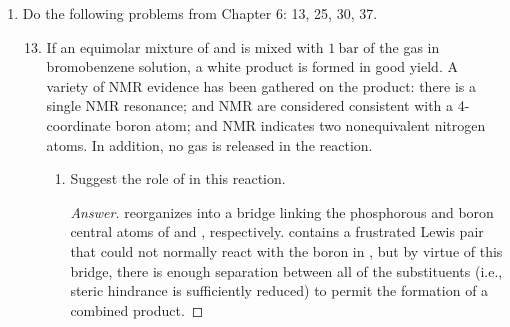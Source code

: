 \documentclass[../psets.tex]{subfiles}
\begin{document}
\begin{enumerate}[label={\Roman*)}]
\begin{enumerate}[label={\alph*.}]
\begin{proof}[Answer]
            \begin{align*}
                \frac{2k_FNa}{\pi} &= \frac{N}{4}\\
                \frac{k_Fa}{\pi} &= \frac{1}{8}\\
                k_F &= \frac{\pi}{8a}\\
                \Aboxed{k_F &= \SI{6.25e8}{\meter}}
            \end{align*}
            As to the other part of the question, refer to Figure \ref{fig:s-orbitalsb} once again. It tells us that the height of the Fermi energy above the bottom of the band is given by
            \begin{align*}
                h &= E(k_F)-E(0)\\
                &= \alpha+2\beta\cos\left( \frac{\pi}{8a}\cdot a \right)-(\alpha+2\beta\cos(0\cdot a))\\
                &= 2\beta\left( \cos\left( \frac{\pi}{8} \right)-1 \right)\\
                \Aboxed{h &= \SI{0.304}{eV}}
            \end{align*}
        \end{proof}
    \end{enumerate}
    \newpage
    \item Do the following problems from Chapter 6: 13, 25, 30, 37.
    \begin{enumerate}[label={\textbf{6.\arabic*}}]
        \setcounter{enumii}{12}
        \item If an equimolar mixture of  and  is mixed with $\SI{1}{\bar}$ of the gas  in bromobenzene solution, a white product is formed in good yield. A variety of NMR evidence has been gathered on the product: there is a single  NMR resonance;  and  NMR are considered consistent with a 4-coordinate boron atom; and  NMR indicates two nonequivalent nitrogen atoms. In addition, no gas is released in the reaction.
        \begin{enumerate}[label={\textbf{\alph*.}}]
            \item Suggest the role of  in this reaction.
            \begin{proof}[Answer]
                 reorganizes into a bridge linking the phosphorous and boron central atoms of  and , respectively.  contains a frustrated Lewis pair that could not normally react with the boron in , but by virtue of this bridge, there is enough separation between all of the substituents (i.e., steric hindrance is sufficiently reduced) to permit the formation of a combined product.

\end{proof}
\end{enumerate}
\end{enumerate}
\end{enumerate}
\end{document}
